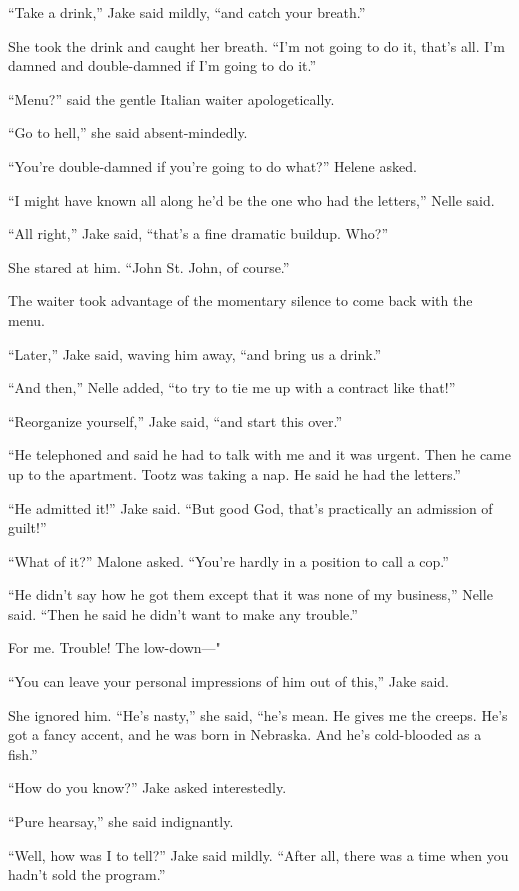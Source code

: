 \documentclass{novel}
\begin{document}
“Take a drink,” Jake said mildly, “and catch your breath.”

She took the drink and caught her breath. “I'm not going to do it, that’s all. I’m damned and double-damned if I’m going to do it.”

“Menu?” said the gentle Italian waiter apologetically.

“Go to hell,” she said absent-mindedly.

“You’re double-damned if you’re going to do what?” Helene asked.

“I might have known all along he’d be the one who had the letters,” Nelle said.

“All right,” Jake said, “that’s a fine dramatic buildup. Who?”

She stared at him. “John St. John, of course.”

The waiter took advantage of the momentary silence to come back with the menu.

“Later,” Jake said, waving him away, “and bring us a drink.”

“And then,” Nelle added, “to try to tie me up with a contract like that!”

“Reorganize yourself,” Jake said, “and start this over.”

“He telephoned and said he had to talk with me and it was urgent. Then he came up to the apartment. Tootz was taking a nap. He said he had the letters.”

“He admitted it!” Jake said. “But good God, that’s practically an admission of guilt!”

“What of it?” Malone asked. “You’re hardly in a position to call a cop.”

“He didn’t say how he got them except that it was none of my business,” Nelle said. “Then he said he didn’t want to make any trouble.”

For me. Trouble! The low-down—"

“You can leave your personal impressions of him out of this,” Jake said.

She ignored him. “He’s nasty,” she said, “he’s mean. He gives me the creeps. He’s got a fancy accent, and he was born in Nebraska. And he’s cold-blooded as a fish.”

“How do you know?” Jake asked interestedly.

“Pure hearsay,” she said indignantly.

“Well, how was I to tell?” Jake said mildly. “After all, there was a time when you hadn’t sold the program.”
\end{document}
